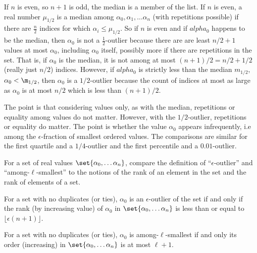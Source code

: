 \documentclass[12pt]{article}
\begin{document}
\begin{example}
\begin{solution}
    If \( n \) is even, so \( n + 1 \) is odd, the median is a member
    of the list.  If \( n \) is even, a real number \( \mu_{1/2} \) is
    a median among \( \alpha_0, \alpha_1, \dots \alpha_n \) (with
    repetitions possible) if there are \( \frac{n}{2} \) indices for
    which \( \alpha_i \le \mu_ {1/2} \).  So if \( n \) is even and if
    \( alpha_0 \) happens to be the median, then \( \alpha_0 \) is not
    a \( \frac{1}{2} \)-outlier because there are are least
    \( n/2 + 1 \) values at most \( \alpha_0 \), including
    \( \alpha_0 \) itself, possibly more if there are repetitions in
    the set.  That is, if \( \alpha_0 \) is the median, it is not
    among at most \( (n+1)/2 = n/2 + 1/2 \) (really just \( n/2 \))
    indices.  However, if \( alpha_0 \) is strictly less than the
    median \( m_{1/2} \), \( \alpha_0 < \m_{1/2} \), then
    \( \alpha_0 \) is a \( 1/2 \)-outlier because the count of indices
    at most as large as \( \alpha_0 \) is at most \( n/2 \) which is
    less than \( (n+1)/2 \).

    The point is that considering values only, as with the median,
    repetitions or equality among values do not matter.  However, with
    the \( 1/2 \)-outlier, repetitions or equality do matter.  The
    point is whether the value \( \alpha_0 \) appears infrequently,
    i.e among the  \( \epsilon \)-fraction of smallest ordered values.
    The comparisons are similar for the first quartile and a \(1/4\)-outlier
    and the first percentile and a \( 0.01 \)-outlier.
\end{solution}

\begin{exercise}
    For a set of real values \( \set{\alpha_0, \dots \alpha_n} \),
    compare the definition of ``\( \epsilon \)-outlier'' and ``among-\(
    \ell \)-smallest'' to the notions of the rank of an element in the
    set and the rank of elements of a set.
\end{exercise}
\begin{solution}
    For a set with no duplicates (or ties), \( \alpha_0 \) is an \(
    \epsilon \)-outlier of the set if and only if the rank (by
    increasing value) of \( \alpha_0 \) in \( \set{\alpha_0, \dots
    \alpha_n} \) is less than or equal to \( \lfloor \epsilon(n+1)  \rfloor \).

    For a set with no duplicates (or ties), \( \alpha_0 \) is among-\(
    \ell \)-smallest if and only its order (increasing) in \( \set{\alpha_0,
    \dots \alpha_n} \) is at most \( \ell + 1 \).


\end{solution}
\end{example}
\end{document}
